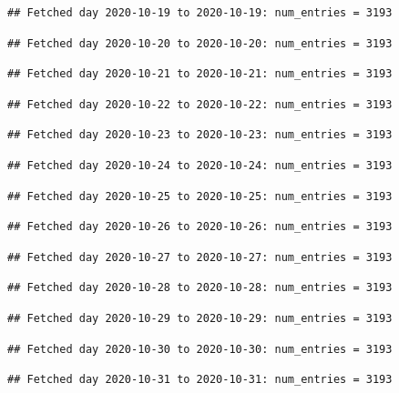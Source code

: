 \documentclass[]{article}
\begin{document}
\begin{verbatim}
## Fetched day 2020-10-19 to 2020-10-19: num_entries = 3193
\end{verbatim}

\begin{verbatim}
## Fetched day 2020-10-20 to 2020-10-20: num_entries = 3193
\end{verbatim}

\begin{verbatim}
## Fetched day 2020-10-21 to 2020-10-21: num_entries = 3193
\end{verbatim}

\begin{verbatim}
## Fetched day 2020-10-22 to 2020-10-22: num_entries = 3193
\end{verbatim}

\begin{verbatim}
## Fetched day 2020-10-23 to 2020-10-23: num_entries = 3193
\end{verbatim}

\begin{verbatim}
## Fetched day 2020-10-24 to 2020-10-24: num_entries = 3193
\end{verbatim}

\begin{verbatim}
## Fetched day 2020-10-25 to 2020-10-25: num_entries = 3193
\end{verbatim}

\begin{verbatim}
## Fetched day 2020-10-26 to 2020-10-26: num_entries = 3193
\end{verbatim}

\begin{verbatim}
## Fetched day 2020-10-27 to 2020-10-27: num_entries = 3193
\end{verbatim}

\begin{verbatim}
## Fetched day 2020-10-28 to 2020-10-28: num_entries = 3193
\end{verbatim}

\begin{verbatim}
## Fetched day 2020-10-29 to 2020-10-29: num_entries = 3193
\end{verbatim}

\begin{verbatim}
## Fetched day 2020-10-30 to 2020-10-30: num_entries = 3193
\end{verbatim}

\begin{verbatim}
## Fetched day 2020-10-31 to 2020-10-31: num_entries = 3193
\end{verbatim}
\end{document}
